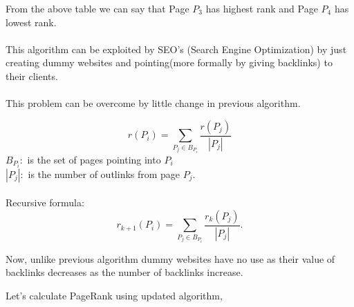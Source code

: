 \noindent From the above table we can say that Page $P_3$ has highest rank and Page $P_4$ has lowest rank.\\
\\
\noindent This algorithm can be exploited by SEO's (Search Engine Optimization) by just creating dummy websites and pointing(more formally by giving backlinks) to their clients.\\
\\
\noindent This problem can be overcome by little change in previous algorithm.

$$
r\left(P_{i}\right)=\sum_{P_{j} \in B_{P_{i}}} \frac{r\left(P_{j}\right)}{\left|P_{j}\right|}
$$
$B_{P_{i}}:$ is the set of pages pointing into $P_{i}$ \\
$|P_{j}|:$ is the number of outlinks from page $P_{j}$.\\
\\
Recursive formula:
$$
r_{k+1}\left(P_{i}\right)=\sum_{P_{j} \in B_{P_{i}}} \frac{r_{k}\left(P_{j}\right)}{\left|P_{j}\right|} .
$$

\noindent Now, unlike previous algorithm dummy websites have no use as their value of backlinks decreases as the number of backlinks increase.

\begin{center}
\end{center}
	
Let's calculate PageRank using updated algorithm,
	

